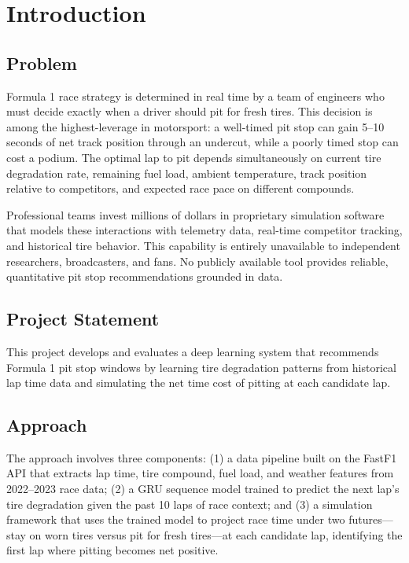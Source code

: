 \documentclass[12pt]{article}
\begin{document}
\newpage
\tableofcontents
\newpage

\section{Introduction}

\subsection{Problem}

Formula 1 race strategy is determined in real time by a team of engineers who must decide exactly when a driver should pit for fresh tires. This decision is among the highest-leverage in motorsport: a well-timed pit stop can gain 5--10 seconds of net track position through an undercut, while a poorly timed stop can cost a podium. The optimal lap to pit depends simultaneously on current tire degradation rate, remaining fuel load, ambient temperature, track position relative to competitors, and expected race pace on different compounds.

Professional teams invest millions of dollars in proprietary simulation software that models these interactions with telemetry data, real-time competitor tracking, and historical tire behavior. This capability is entirely unavailable to independent researchers, broadcasters, and fans. No publicly available tool provides reliable, quantitative pit stop recommendations grounded in data.

\subsection{Project Statement}

This project develops and evaluates a deep learning system that recommends Formula 1 pit stop windows by learning tire degradation patterns from historical lap time data and simulating the net time cost of pitting at each candidate lap.

\subsection{Approach}

The approach involves three components: (1) a data pipeline built on the FastF1 API \cite{fastf1} that extracts lap time, tire compound, fuel load, and weather features from 2022--2023 race data; (2) a GRU sequence model \cite{cho2014} trained to predict the next lap's tire degradation given the past 10 laps of race context; and (3) a simulation framework that uses the trained model to project race time under two futures---stay on worn tires versus pit for fresh tires---at each candidate lap, identifying the first lap where pitting becomes net positive.
\end{document}

